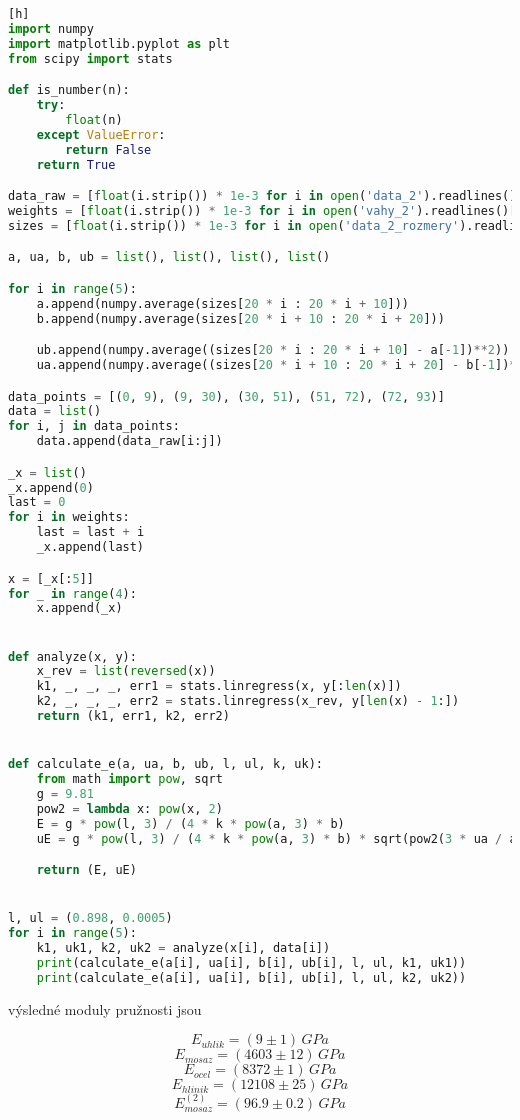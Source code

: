 \documentclass[a4paper,11pt]{article}
\begin{document}
\begin{lstlisting}[language=Python][h]
import numpy
import matplotlib.pyplot as plt
from scipy import stats

def is_number(n):
    try:
        float(n)
    except ValueError:
        return False
    return True

data_raw = [float(i.strip()) * 1e-3 for i in open('data_2').readlines() if is_number(i)]
weights = [float(i.strip()) * 1e-3 for i in open('vahy_2').readlines()[:10]]
sizes = [float(i.strip()) * 1e-3 for i in open('data_2_rozmery').readlines() if is_number(i)]

a, ua, b, ub = list(), list(), list(), list()

for i in range(5):
    a.append(numpy.average(sizes[20 * i : 20 * i + 10]))
    b.append(numpy.average(sizes[20 * i + 10 : 20 * i + 20]))

    ub.append(numpy.average((sizes[20 * i : 20 * i + 10] - a[-1])**2))
    ua.append(numpy.average((sizes[20 * i + 10 : 20 * i + 20] - b[-1])**2))

data_points = [(0, 9), (9, 30), (30, 51), (51, 72), (72, 93)]
data = list()
for i, j in data_points:
    data.append(data_raw[i:j])

_x = list()
_x.append(0)
last = 0
for i in weights:
    last = last + i
    _x.append(last)

x = [_x[:5]]
for _ in range(4):
    x.append(_x)


def analyze(x, y):
    x_rev = list(reversed(x))
    k1, _, _, _, err1 = stats.linregress(x, y[:len(x)])
    k2, _, _, _, err2 = stats.linregress(x_rev, y[len(x) - 1:])
    return (k1, err1, k2, err2)


def calculate_e(a, ua, b, ub, l, ul, k, uk):
    from math import pow, sqrt
    g = 9.81
    pow2 = lambda x: pow(x, 2)
    E = g * pow(l, 3) / (4 * k * pow(a, 3) * b)
    uE = g * pow(l, 3) / (4 * k * pow(a, 3) * b) * sqrt(pow2(3 * ua / a) + pow2(ub / b) + pow2(3 * ul / l) + pow2(uk / k))

    return (E, uE)


l, ul = (0.898, 0.0005)
for i in range(5):
    k1, uk1, k2, uk2 = analyze(x[i], data[i])
    print(calculate_e(a[i], ua[i], b[i], ub[i], l, ul, k1, uk1))
    print(calculate_e(a[i], ua[i], b[i], ub[i], l, ul, k2, uk2)) \end{lstlisting}

    výsledné moduly pružnosti jsou

    $$ E_{uhlik} = \left(9 \pm 1\right) \, GPa$$
    $$ E_{mosaz} = \left(4603 \pm 12\right) \, GPa$$
    $$ E_{ocel} = \left(8372 \pm 1\right) \, GPa$$
    $$ E_{hlinik} = \left(12108 \pm 25\right) \, GPa$$
    $$ E_{mosaz}^{(2)} = \left(96.9 \pm 0.2\right) \, GPa$$
\end{document}
